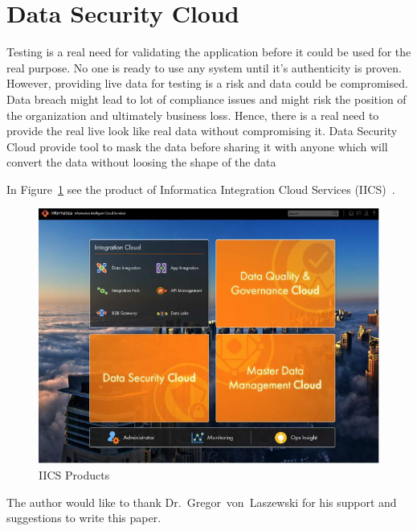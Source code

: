 \section{Data Security Cloud}
Testing is a real need for validating the application before it could be used for the real purpose. No one is ready to use any system until it's authenticity is proven. However, providing
live data for testing is a risk and data could be
compromised. Data breach might lead to lot of compliance issues and might risk the position of the organization and ultimately business loss. Hence, there is a real need to provide the real live look like real data without compromising it. Data Security Cloud\cite{hid-sp18-511-iics}
provide tool to mask the data before sharing it with anyone which
will convert the data without loosing the shape of the data

In Figure~\ref{f:iics-products}\cite{hid-sp18-511-iics} see the
product of Informatica Integration Cloud Services
(IICS)~\cite{hid-sp18-511-iics}.


\begin{figure}[!ht]
	\centering\includegraphics[width=\columnwidth]{images/IICS-0.jpg}
	\caption{IICS Products}\label{f:iics-products}
\end{figure}

\begin{acks}

The author would like to thank Dr.~Gregor~von~Laszewski for his
support and suggestions to write this paper.

\end{acks}


 
